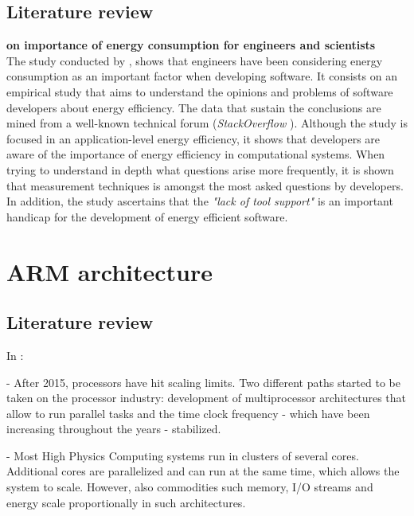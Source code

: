 \subsection{Literature review}

\textbf{on importance of energy consumption for engineers and scientists}
\\
The study conducted by \cite{QUESTIONS_ENERGY}, shows that engineers have been
considering energy consumption as an important factor when developing software.
It consists on an empirical study that aims to understand the opinions and
problems of software developers about energy efficiency. The data that sustain
the conclusions are  mined from
a well-known technical forum (\textit{StackOverflow} \cite{STACKOVERFLOW}).
Although the study is focused in an application-level energy efficiency, it
shows that developers are aware of the importance of energy efficiency in 
computational systems. When trying to understand in depth what questions arise 
more frequently, it is shown that measurement techniques is amongst the most
asked questions by developers. In addition, the study ascertains that the 
\textit{"lack of tool support"} is an important handicap for the development of 
energy efficient software.






\section{ARM architecture}
\subsection{Literature review}


In \cite{ACAT13ARM}:

- After 2015, processors have hit scaling limits. Two different paths started to be
taken on the processor industry:  development of multiprocessor architectures that
allow to run parallel tasks and the time clock frequency - which have been
increasing throughout the years - stabilized.

- Most High Physics Computing systems run in clusters of several cores.
Additional cores are parallelized and can run at the same time, which allows the
system to scale. However, also commodities such memory, I/O streams and energy
scale proportionally in such architectures.
 
 
